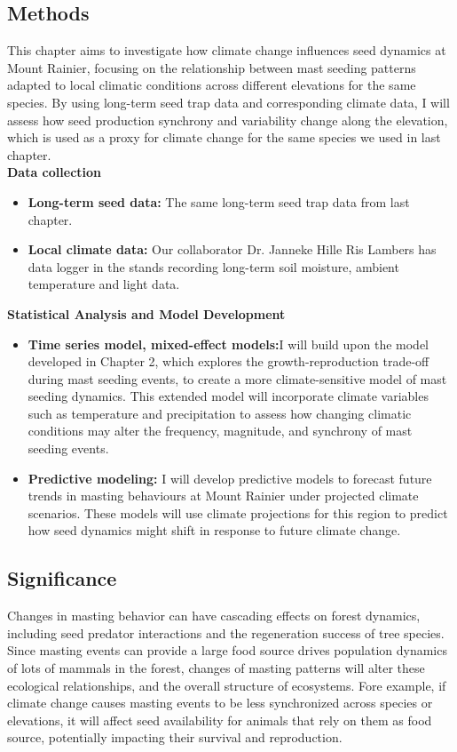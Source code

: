 \documentclass[11pt,letter]{article}
\begin{document}
\subsection{Methods}
This chapter aims to investigate how climate change influences seed dynamics at Mount Rainier, focusing on the relationship between mast seeding patterns adapted to local climatic conditions across different elevations for the same species. By using long-term seed trap data and corresponding climate data, I will assess how seed production synchrony and variability change along the elevation, which is used as a proxy for climate change for the same species we used in last chapter.\\
\textbf{Data collection}\\
\begin{itemize}
\item\textbf{Long-term seed data:} The same long-term seed trap data from last chapter.
\item\textbf{Local climate data:}  Our collaborator Dr. Janneke Hille Ris Lambers has data logger in the stands recording long-term soil moisture, ambient temperature and light data.
\end{itemize}
\textbf{Statistical Analysis and Model Development}\\
\begin{itemize}
\item\textbf{Time series model, mixed-effect models:}I will build upon the model developed in Chapter 2, which explores the growth-reproduction trade-off during mast seeding events, to create a more climate-sensitive model of mast seeding dynamics. This extended model will incorporate climate variables such as temperature and precipitation to assess how changing climatic conditions may alter the frequency, magnitude, and synchrony of mast seeding events. \\
\item\textbf{Predictive modeling:} I will develop predictive models to forecast future trends in masting behaviours at Mount Rainier under projected climate scenarios. These models will use climate projections for this region to predict how seed dynamics might shift in response to future climate change.
\end{itemize}
\subsection{Significance}
Changes in masting behavior can have cascading effects on forest dynamics, including seed predator interactions and the regeneration success of tree species. Since masting events can provide a large food source drives population dynamics of lots of mammals in the forest, changes of masting patterns will alter these ecological relationships, and the overall structure of ecosystems. Fore example, if climate change causes masting events to be less synchronized across species or elevations, it will affect seed availability for animals that rely on them as food source, potentially impacting their survival and reproduction.\par
\end{document}

